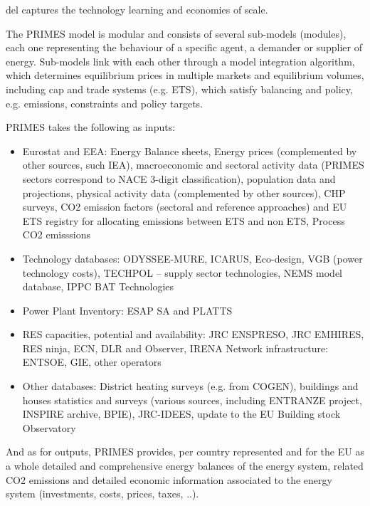 \documentclass[lettersize,journal]{IEEEtran}
\begin{document}
  del captures the technology learning and economies of scale.

  The PRIMES model is modular and consists of several sub-models (modules), each one representing the behaviour of a specific agent, a demander or supplier of energy. Sub-models link with each other through a model integration algorithm, which determines equilibrium prices in multiple markets and equilibrium volumes, including cap and trade systems (e.g. ETS), which satisfy balancing and policy, e.g. emissions, constraints and policy targets.

  PRIMES takes the following as inputs:
  \begin{itemize}
  \item Eurostat and EEA: Energy Balance sheets, Energy prices (complemented by other sources, such IEA), macroeconomic and sectoral activity data (PRIMES sectors correspond to NACE 3-digit classification), population data and projections, physical activity data (complemented by other sources), CHP surveys, CO2 emission factors (sectoral and reference approaches) and EU ETS registry for allocating emissions between ETS and non ETS, Process CO2 emisssions

  \item Technology databases: ODYSSEE-MURE, ICARUS, Eco-design, VGB (power technology costs), TECHPOL – supply sector technologies, NEMS model database, IPPC BAT Technologies

  \item Power Plant Inventory: ESAP SA and PLATTS

  \item RES capacities, potential and availability: JRC ENSPRESO, JRC EMHIRES, RES ninja, ECN, DLR and Observer, IRENA Network infrastructure: ENTSOE, GIE, other operators

  \item Other databases: District heating surveys (e.g. from COGEN), buildings and houses statistics and surveys (various sources, including ENTRANZE project, INSPIRE archive, BPIE), JRC-IDEES, update to the EU Building stock Observatory
  \end{itemize}

  And as for outputs, PRIMES provides, per country represented and for the EU as a whole detailed and comprehensive energy balances of the energy system, related CO2 emissions and detailed economic information associated to the energy system (investments, costs, prices, taxes, ..).\cite{primes}
\end{document}
